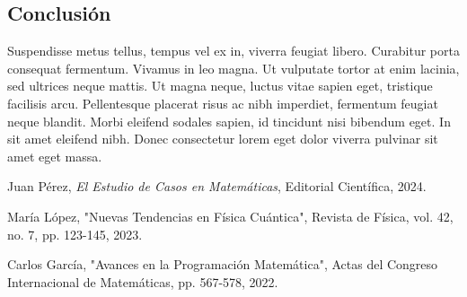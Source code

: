 \documentclass{article}
\begin{document}
\begin{multicols}{2}
		\section{Conclusión}
		Suspendisse metus tellus, tempus vel ex in, viverra feugiat libero. Curabitur porta consequat fermentum. Vivamus in leo magna. Ut vulputate tortor at enim lacinia, sed ultrices neque mattis. Ut magna neque, luctus vitae sapien eget, tristique facilisis arcu. Pellentesque placerat risus ac nibh imperdiet, fermentum feugiat neque blandit. Morbi eleifend sodales sapien, id tincidunt nisi bibendum eget. In sit amet eleifend nibh. Donec consectetur lorem eget dolor viverra pulvinar sit amet eget massa.
	\end{multicols}
	
	\renewcommand{\refname}{Referencias} %
	\begin{thebibliography}{9}
		Juan Pérez,
		\textit{El Estudio de Casos en Matemáticas},
		Editorial Científica, 2024.
		
		María López,
		"Nuevas Tendencias en Física Cuántica",
		Revista de Física, vol. 42, no. 7, pp. 123-145, 2023.
		
		Carlos García,
		"Avances en la Programación Matemática",
		Actas del Congreso Internacional de Matemáticas, pp. 567-578, 2022.
	\end{thebibliography}
	
\end{document}

